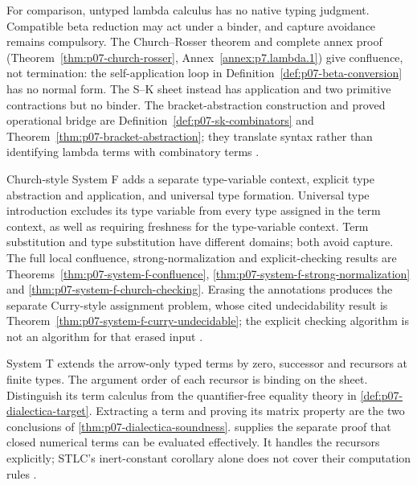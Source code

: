 
For comparison, untyped lambda calculus has no native typing judgment.
Compatible beta reduction may act under a binder, and capture avoidance
remains compulsory.  The Church--Rosser theorem and complete annex proof
(Theorem~\ref{thm:p07-church-rosser}, Annex~\ref{annex:p7.lambda.1})
give confluence, not termination: the self-application loop in
Definition~\ref{def:p07-beta-conversion} has no normal form.
The S--K sheet instead has application and two primitive contractions but
no binder.  The bracket-abstraction construction and proved operational
bridge are Definition~\ref{def:p07-sk-combinators} and
Theorem~\ref{thm:p07-bracket-abstraction}; they translate syntax rather
than identifying lambda terms with combinatory terms
\cite{ChurchRosser1936,CurryFeys1958,Barendregt1984}.


Church-style System F adds a separate type-variable context, explicit
type abstraction and application, and universal type formation.
Universal type introduction excludes its type variable from every type
assigned in the term context, as well as requiring freshness for the
type-variable context.  Term substitution and type substitution have
different domains; both avoid capture.  The full local confluence,
strong-normalization and explicit-checking results are
Theorems~\ref{thm:p07-system-f-confluence},
\ref{thm:p07-system-f-strong-normalization} and
\ref{thm:p07-system-f-church-checking}.
Erasing the annotations produces the separate Curry-style assignment
problem, whose cited undecidability result is
Theorem~\ref{thm:p07-system-f-curry-undecidable}; the explicit checking
algorithm is not an algorithm for that erased input
\cite{Girard1972,GirardLafontTaylor2003Web,Wells1999}.


System T extends the arrow-only typed terms by zero, successor and
recursors at finite types. The argument order of each recursor is binding
on the sheet. Distinguish its term calculus from the quantifier-free
equality theory in \cref{def:p07-dialectica-target}. Extracting a term
and proving its matrix property are the two conclusions of
\cref{thm:p07-dialectica-soundness}.
 supplies the separate
proof that closed numerical terms can be evaluated effectively. It
handles the recursors explicitly; STLC's inert-constant corollary alone
does not cover their computation rules \cite{AvigadFeferman1998}.

